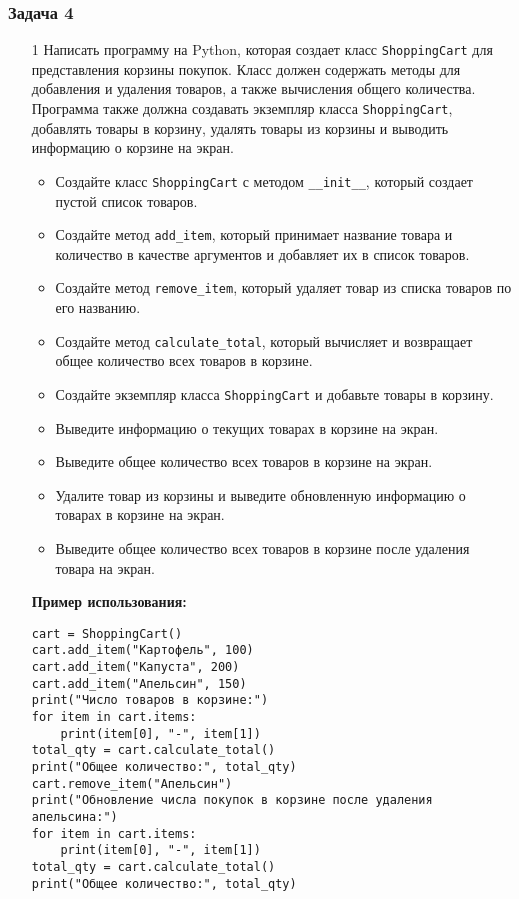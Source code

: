 \subsubsection{Задача 4}

\begin{enumerate}
\item[1] Написать программу на Python, которая создает класс \texttt{ShoppingCart} для представления корзины покупок. Класс должен содержать методы для добавления и удаления товаров, а также вычисления общего количества. Программа также должна создавать экземпляр класса \texttt{ShoppingCart}, добавлять товары в корзину, удалять товары из корзины и выводить информацию о корзине на экран.

\begin{itemize}
    \item Создайте класс \texttt{ShoppingCart} с методом \texttt{\_\_init\_\_}, который создает пустой список товаров.
    \item Создайте метод \texttt{add\_item}, который принимает название товара и количество в качестве аргументов и добавляет их в список товаров.
    \item Создайте метод \texttt{remove\_item}, который удаляет товар из списка товаров по его названию.
    \item Создайте метод \texttt{calculate\_total}, который вычисляет и возвращает общее количество всех товаров в корзине.
    \item Создайте экземпляр класса \texttt{ShoppingCart} и добавьте товары в корзину.
    \item Выведите информацию о текущих товарах в корзине на экран.
    \item Выведите общее количество всех товаров в корзине на экран.
    \item Удалите товар из корзины и выведите обновленную информацию о товарах в корзине на экран.
    \item Выведите общее количество всех товаров в корзине после удаления товара на экран.
\end{itemize}

\textbf{Пример использования:}

\begin{verbatim}
cart = ShoppingCart()
cart.add_item("Картофель", 100)
cart.add_item("Капуста", 200)
cart.add_item("Апельсин", 150)
print("Число товаров в корзине:")
for item in cart.items:
    print(item[0], "-", item[1])
total_qty = cart.calculate_total()
print("Общее количество:", total_qty)
cart.remove_item("Апельсин")
print("Обновление числа покупок в корзине после удаления апельсина:")
for item in cart.items:
    print(item[0], "-", item[1])
total_qty = cart.calculate_total()
print("Общее количество:", total_qty)
\end{verbatim}


\end{enumerate}
